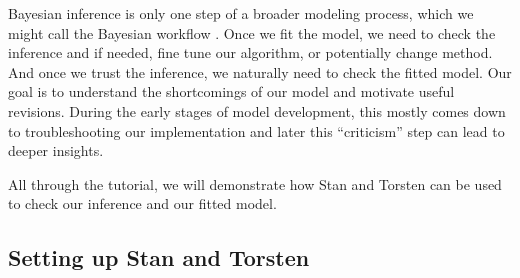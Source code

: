 Bayesian inference is only one step of a broader modeling process, which we might call the Bayesian workflow \cite{Betancourt:2018, Gelman:2020}.
Once we fit the model, we need to check the inference and if needed, fine tune our algorithm, or potentially change method.
And once we trust the inference, we naturally need to check the fitted model.
Our goal is to understand the shortcomings of our model and motivate useful revisions.
During the early stages of model development, this mostly comes down to troubleshooting our implementation and later this ``criticism'' step can lead to deeper insights.

All through the tutorial, we will demonstrate how Stan and Torsten can be used to check our inference and our fitted model.

\subsection{Setting up Stan and Torsten}


 
